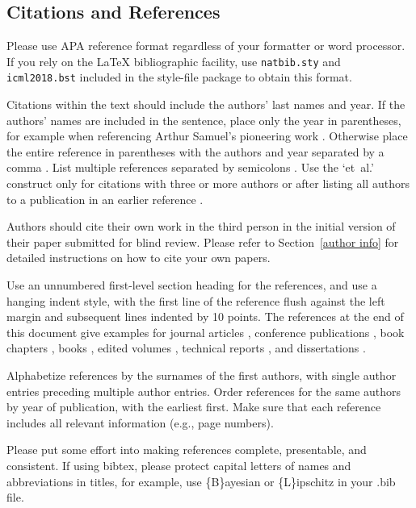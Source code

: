 \documentclass{article}
\begin{document}
\subsection{Citations and References}

Please use APA reference format regardless of your formatter
or word processor. If you rely on the \LaTeX\/ bibliographic
facility, use \texttt{natbib.sty} and \texttt{icml2018.bst}
included in the style-file package to obtain this format.

Citations within the text should include the authors' last names and
year. If the authors' names are included in the sentence, place only
the year in parentheses, for example when referencing Arthur Samuel's
pioneering work . Otherwise place the entire
reference in parentheses with the authors and year separated by a
comma \cite{Samuel59}. List multiple references separated by
semicolons \cite{kearns89,Samuel59,mitchell80}. Use the `et~al.'
construct only for citations with three or more authors or after
listing all authors to a publication in an earlier reference \cite{MachineLearningI}.

Authors should cite their own work in the third person
in the initial version of their paper submitted for blind review.
Please refer to Section~\ref{author info} for detailed instructions on how to
cite your own papers.

Use an unnumbered first-level section heading for the references, and use a
hanging indent style, with the first line of the reference flush against the
left margin and subsequent lines indented by 10 points. The references at the
end of this document give examples for journal articles \cite{Samuel59},
conference publications \cite{langley00}, book chapters \cite{Newell81}, books
\cite{DudaHart2nd}, edited volumes \cite{MachineLearningI}, technical reports
\cite{mitchell80}, and dissertations \cite{kearns89}.

Alphabetize references by the surnames of the first authors, with
single author entries preceding multiple author entries. Order
references for the same authors by year of publication, with the
earliest first. Make sure that each reference includes all relevant
information (e.g., page numbers).

Please put some effort into making references complete, presentable, and
consistent. If using bibtex, please protect capital letters of names and
abbreviations in titles, for example, use \{B\}ayesian or \{L\}ipschitz
in your .bib file.
\end{document}
